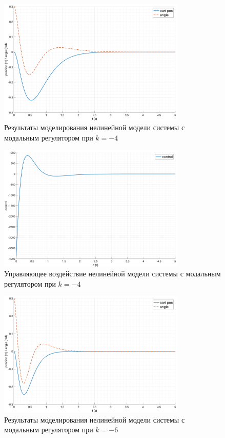 \begin{figure}[ht!]
    \centering
    \includegraphics[width=0.8\textwidth]{media/plots/modal_controllers/modal_control_out_1.png}
    \caption{Результаты моделирования нелинейной модели системы с модальным регулятором при $k = -4$}
    \label{fig:modal_controlers_1_out}
\end{figure}
\begin{figure}[ht!]
    \centering
    \includegraphics[width=0.8\textwidth]{media/plots/modal_controllers/modal_control_u_1.png}
    \caption{Управляющее воздействие нелинейной модели системы с модальным регулятором при $k = -4$}
    \label{fig:modal_controlers_1_u}
\end{figure}
\begin{figure}[ht!]
    \centering
    \includegraphics[width=0.8\textwidth]{media/plots/modal_controllers/modal_control_out_2.png}
    \caption{Результаты моделирования нелинейной модели системы с модальным регулятором при $k = -6$}
    \label{fig:modal_controlers_2_out}
\end{figure}
